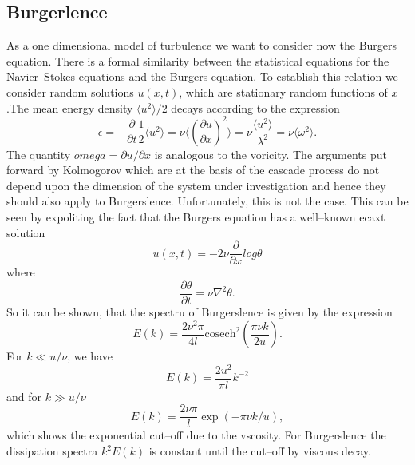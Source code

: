 \subsection{Burgerlence}
As a one dimensional model of turbulence we want to consider now the Burgers
equation. There is a formal similarity between  the statistical equations for
the Navier--Stokes equations and the Burgers equation. To establish this
relation we consider random solutions $u(x,t)$, which are stationary random
functions of $x$.The mean energy density $\langle u^2 \rangle/2$ decays
according to the expression
\begin{displaymath}
  \epsilon = - \frac{\partial}{\partial t} \frac{1}{2} \langle u^2 \rangle
           = \nu \langle (\frac{\partial u}{\partial x})^2 \rangle
           =\nu \frac{\langle u^2 \rangle}{\lambda^2}
           = \nu \langle \omega^2 \rangle.
\end{displaymath}
The quantity $omega = \partial u/ \partial x$ is analogous to the
voricity. The arguments put forward by Kolmogorov which are at
the basis of the cascade process do not depend upon the dimension of the
system under investigation and hence they should also apply to Burgerslence. 
Unfortunately, this is not the case. This can be seen by expoliting the 
fact  that the Burgers equation has a
well--known ecaxt solution
\begin{displaymath}
  u(x,t) = - 2 \nu \frac{\partial}{\partial x} log \theta
\end{displaymath}
where
\begin{displaymath}
  \frac{\partial \theta}{\partial t} = \nu \nabla^2 \theta.
\end{displaymath}
So it can be shown, that the spectru of Burgerslence is given by the
expression
\begin{displaymath}
  E(k) = \frac{2 \nu^2 \pi}{4 l} \textrm{cosech}^2 
         \left( \frac{\pi \nu k}{2 u} \right).
\end{displaymath}
For $k \ll u/\nu$, we have
\begin{displaymath}
  E(k) = \frac{2 u^2}{\pi l} k^{-2}
\end{displaymath}
and for $k \gg u/\nu$
\begin{displaymath}
  E(k) = \frac{2 \nu \pi}{l} \exp(-\pi \nu k/u),
\end{displaymath}
which shows the exponential cut--off due to the vscosity.
For Burgerslence the dissipation spectra $k^2E(k)$ is constant until the
cut--off by viscous decay.

